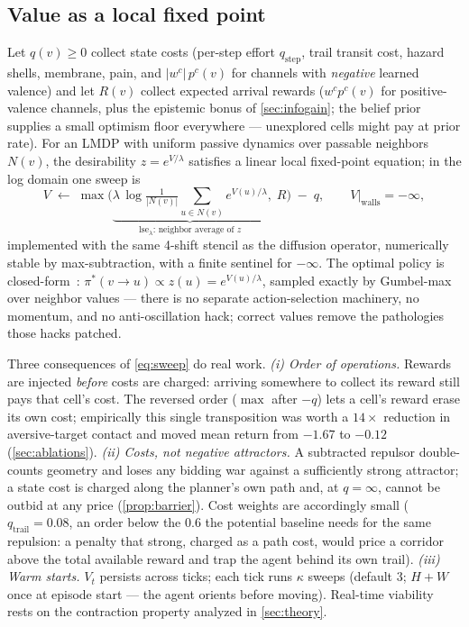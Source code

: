 \documentclass[11pt]{article}
\newcommand{\lse}{\mathrm{lse}}
\begin{document}
\subsection{Value as a local fixed point}
\label{sec:value}
Let $q(v)\ge0$ collect state costs (per-step effort $q_{\text{step}}$, trail transit cost, hazard shells, membrane, pain, and $|w^c|\,p^c(v)$ for channels with \emph{negative} learned valence) and let $R(v)$ collect expected arrival rewards ($w^c p^c(v)$ for positive-valence channels, plus the epistemic bonus of \cref{sec:infogain}; the belief prior supplies a small optimism floor everywhere --- unexplored cells might pay at prior rate). For an LMDP with uniform passive dynamics over passable neighbors $N(v)$, the desirability $z=e^{V/\lambda}$ satisfies a linear local fixed-point equation; in the log domain one sweep is
\begin{equation}
V \;\leftarrow\; \max\!\Big(\underbrace{\lambda\,\log \tfrac{1}{|N(v)|}\!\!\sum_{u\in N(v)}\!\! e^{V(u)/\lambda}}_{\lse_\lambda\text{: neighbor average of } z}, \; R\Big) \;-\; q,
\qquad V\big|_{\text{walls}} = -\infty,
\label{eq:sweep}
\end{equation}
implemented with the same 4-shift stencil as the diffusion operator, numerically stable by max-subtraction, with a finite sentinel for $-\infty$. The optimal policy is closed-form~\citep{todorov2006}: $\pi^\ast(v\to u)\propto z(u) = e^{V(u)/\lambda}$, sampled exactly by Gumbel-max over neighbor values --- there is no separate action-selection machinery, no momentum, and no anti-oscillation hack; correct values remove the pathologies those hacks patched.

Three consequences of \cref{eq:sweep} do real work. \emph{(i) Order of operations.} Rewards are injected \emph{before} costs are charged: arriving somewhere to collect its reward still pays that cell's cost. The reversed order ($\max$ after $-q$) lets a cell's reward erase its own cost; empirically this single transposition was worth a $14\times$ reduction in aversive-target contact and moved mean return from $-1.67$ to $-0.12$ (\cref{sec:ablations}). \emph{(ii) Costs, not negative attractors.} A subtracted repulsor double-counts geometry and loses any bidding war against a sufficiently strong attractor; a state cost is charged along the planner's own path and, at $q=\infty$, cannot be outbid at any price (\cref{prop:barrier}). Cost weights are accordingly small ($q_{\text{trail}}=0.08$, an order below the $0.6$ the potential baseline needs for the same repulsion: a penalty that strong, charged as a path cost, would price a corridor above the total available reward and trap the agent behind its own trail). \emph{(iii) Warm starts.} $V_t$ persists across ticks; each tick runs $\kappa$ sweeps (default 3; $H{+}W$ once at episode start --- the agent orients before moving). Real-time viability rests on the contraction property analyzed in \cref{sec:theory}.
\end{document}

